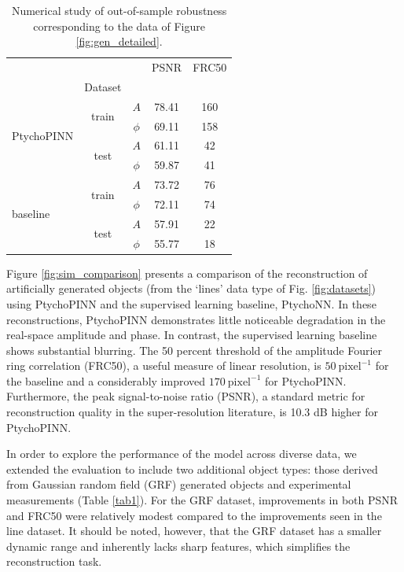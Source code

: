 \documentclass[sn-mathphys]{sn-jnl}%
\theoremstyle{thmstyleone}%
\theoremstyle{thmstyletwo}%
\theoremstyle{thmstylethree}%
\begin{document}
\begin{table}[h]
\begin{center}
\caption{Numerical study of out-of-sample robustness corresponding to the data of Figure \ref{fig:gen_detailed}.}\label{tab2}%
\begin{tabular}{lcccc}
\toprule
           &      &      &  PSNR &  FRC50 \\
& Dataset & &       &        \\
\midrule
\multirow{4}{*}{PtychoPINN} & \multirow{2}{*}{train} & $A$ & 78.41 & 160 \\
           &      & $\phi$ & 69.11 & 158 \\
\cline{2-5}
           & \multirow{2}{*}{test} & $A$ & 61.11 &  42 \\
           &      & $\phi$ & 59.87 &  41 \\
\cline{1-5}
\cline{2-5}
\multirow{4}{*}{baseline} & \multirow{2}{*}{train} & $A$ & 73.72 &  76 \\
           &      & $\phi$ & 72.11 &  74 \\
\cline{2-5}
           & \multirow{2}{*}{test} & $A$ & 57.91 &  22 \\
           &      & $\phi$ & 55.77 &  18 \\
\bottomrule
\end{tabular}
\end{center}
\end{table}

Figure \ref{fig:sim_comparison} presents a comparison of the reconstruction of artificially generated objects (from the `lines' data type of Fig. \ref{fig:datasets}) using PtychoPINN and the supervised learning baseline, PtychoNN. In these reconstructions, PtychoPINN demonstrates little noticeable degradation in the real-space amplitude and phase. In contrast, the supervised learning baseline shows substantial blurring. The 50 percent threshold of the amplitude Fourier ring correlation (FRC50), a useful measure of linear resolution, is $50~\mathrm{pixel}^{-1}$ for the baseline and a considerably improved $170~\mathrm{pixel}^{-1}$ for PtychoPINN. Furthermore, the peak signal-to-noise ratio (PSNR), a standard metric for reconstruction quality in the super-resolution literature, is 10.3 dB higher for PtychoPINN. 

In order to explore the performance of the model across diverse data, we extended the evaluation to include two additional object types: those derived from Gaussian random field (GRF) generated objects and experimental measurements (Table \ref{tab1}). For the GRF dataset, improvements in both PSNR and FRC50 were relatively modest compared to the improvements seen in the line dataset. It should be noted, however, that the GRF dataset has a smaller dynamic range and inherently lacks sharp features, which simplifies the reconstruction task.
\end{document}
